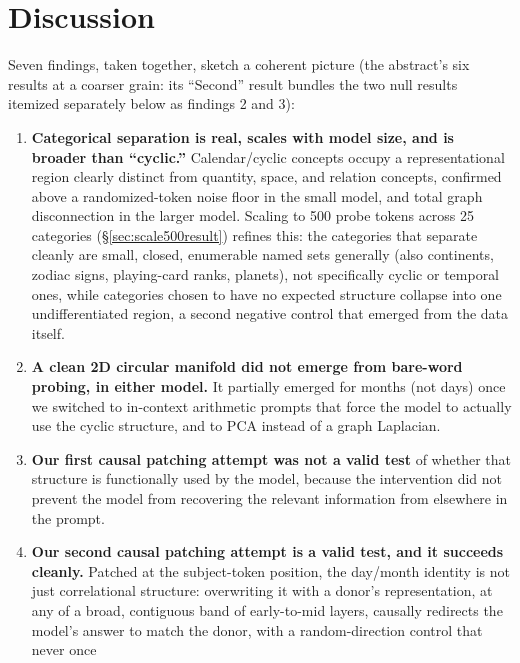\documentclass[11pt]{article}
\begin{document}
\section{Discussion}

Seven findings, taken together, sketch a coherent picture (the abstract's
six results at a coarser grain: its ``Second'' result bundles the two
null results itemized separately below as findings 2 and 3):

\begin{enumerate}
  \item \textbf{Categorical separation is real, scales with model size, and
        is broader than ``cyclic.''} Calendar/cyclic concepts occupy a
        representational region clearly distinct from quantity, space, and
        relation concepts, confirmed above a randomized-token noise floor in
        the small model, and total graph disconnection in the larger model.
        Scaling to 500 probe tokens across 25 categories
        (\S\ref{sec:scale500result}) refines this: the categories that
        separate cleanly are small, closed, enumerable named sets generally
        (also continents, zodiac signs, playing-card ranks, planets), not
        specifically cyclic or temporal ones, while categories chosen to have
        no expected structure collapse into one undifferentiated region, a
        second negative control that emerged from the data itself.
  \item \textbf{A clean 2D circular manifold did not emerge from bare-word
        probing, in either model.} It partially emerged for months
        (not days) once we switched to in-context arithmetic prompts that
        force the model to actually use the cyclic structure, and to PCA
        instead of a graph Laplacian.
  \item \textbf{Our first causal patching attempt was not a valid test} of
        whether that structure is functionally used by the model, because the
        intervention did not prevent the model from recovering the relevant
        information from elsewhere in the prompt.
  \item \textbf{Our second causal patching attempt is a valid test, and it
        succeeds cleanly.} Patched at the subject-token position, the
        day/month identity is not just correlational structure: overwriting
        it with a donor's representation, at any of a broad, contiguous band
        of early-to-mid layers, causally redirects the model's answer to
        match the donor, with a random-direction control that never once

\end{enumerate}
\end{document}
